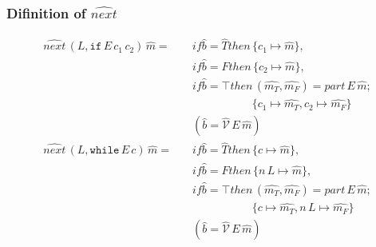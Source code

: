 \documentclass{beamer}
\begin{document}
\begin{frame}
    \frametitle{Difinition of $\hat{next}$ }
    \begin{align*}
        \hat{next} \, (L, \texttt{if} \, E \, {c}_1 \, {c}_2)   \, \hat{m} = & \quad if \hat{b} = \hat{T} then \, \{ {c}_1 \mapsto \hat{m} \}, \\
                                                                            & \quad if \hat{b} = \hat{F} then \, \{ {c}_2 \mapsto \hat{m} \}, \\
                                                                            & \quad if \hat{b} = \top then \, (\hat{m_T}, \hat{m_F}) = part \, E \, \hat{m}; \\
                                                                                  & \quad \quad \quad \quad \quad \quad \, \, \{ {c}_1 \mapsto \hat{m_T}, {c}_2 \mapsto \hat{m_F} \} \\
                                                                                  & \quad (\hat{b} = \hat{\mathcal{V}} \, E \, \hat{m})\\
        \hat{next} \, (L, \texttt{while} \, E \, c)                 \, \hat{m} = & \quad if \hat{b} = \hat{T} then \, \{ c \mapsto \hat{m} \}, \\
                                                                                  & \quad if \hat{b} = \hat{F} then \, \{ n \, L \mapsto \hat{m} \}, \\
                                                                                  & \quad if \hat{b} = \top then \, (\hat{m_T}, \hat{m_F}) = part \, E \, \hat{m}; \\
                                                                                  & \quad \quad \quad \quad \quad \quad \, \, \{ c \mapsto \hat{m_T}, n \, L \mapsto \hat{m_F}\} \\
                                                                                  & \quad (\hat{b} = \hat{\mathcal{V}} \, E \, \hat{m})
    \end{align*}
\end{frame}
\end{document}
